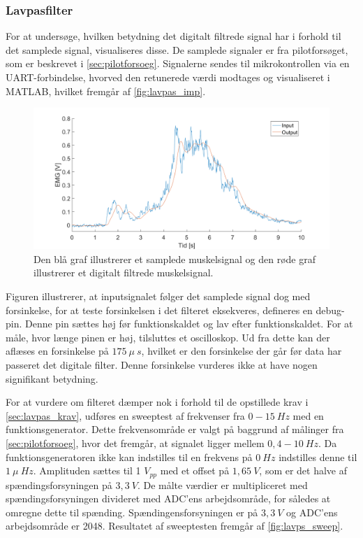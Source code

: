 \subsubsection{Lavpasfilter} \label{sec:lavpas_test}
For at undersøge, hvilken betydning det digitalt filtrede signal har i forhold til det samplede signal, visualiseres disse. De samplede signaler er fra pilotforsøget, som er beskrevet i \autoref{sec:pilotforsoeg}. Signalerne sendes til mikrokontrollen via en UART-forbindelse, hvorved den retunerede værdi modtages og visualiseret i MATLAB, hvilket fremgår af \autoref{fig:lavpas_imp}.

\begin{figure}[H]
\centering
\includegraphics[width=1\textwidth]{figures/EMG_test}
\caption{Den blå graf illustrerer et samplede muskelsignal og den røde graf illustrerer et digitalt filtrede muskelsignal.}
\label{fig:lavpas_imp}
\end{figure}

\noindent
Figuren illustrerer, at inputsignalet følger det samplede signal dog med forsinkelse, for at teste forsinkelsen i det filteret eksekveres, defineres en debug-pin. Denne pin sættes høj før funktionskaldet og lav efter funktionskaldet. For at måle, hvor længe pinen er høj, tilsluttes et oscilloskop. Ud fra dette kan der aflæses en forsinkelse på $175~\mu~s$, hvilket er den forsinkelse der går før data har passeret det digitale filter. Denne forsinkelse vurderes ikke at have nogen signifikant betydning.

For at vurdere om filteret dæmper nok i forhold til de opstillede krav i \autoref{sec:lavpas_krav}, udføres en sweeptest af frekvenser fra $0-15~Hz$ med en funktionsgenerator. Dette frekvensområde er valgt på baggrund af målinger fra \autoref{sec:pilotforsoeg}, hvor det fremgår, at signalet ligger mellem $0,4-10~Hz$.  Da funktionsgeneratoren ikke kan indstilles til en frekvens på $0~Hz$ indstilles denne til $1~\mu~Hz$. Amplituden sættes til 1 $V_{pp}$ med et offset på $1,65~V$, som er det halve af spændingsforsyningen på $3,3~V$. De målte værdier er multipliceret med spændingsforsyningen divideret med ADC'ens arbejdsområde, for således at omregne dette til spænding. Spændingensforsyningen er på $3,3~V$ og ADC'ens arbejdsområde er 2048. Resultatet af sweeptesten fremgår af \autoref{fig:lavps_sweep}.

